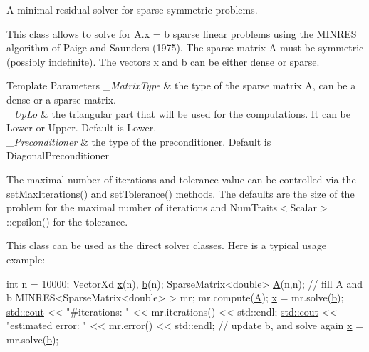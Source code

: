 A minimal residual solver for sparse symmetric problems. 

This class allows to solve for A.\+x = b sparse linear problems using the \hyperlink{class_eigen_1_1_m_i_n_r_e_s}{M\+I\+N\+R\+E\+S} algorithm of Paige and Saunders (1975). The sparse matrix A must be symmetric (possibly indefinite). The vectors x and b can be either dense or sparse.


\begin{DoxyTemplParams}{Template Parameters}
{\em \+\_\+\+Matrix\+Type} & the type of the sparse matrix A, can be a dense or a sparse matrix. \\
\hline
{\em \+\_\+\+Up\+Lo} & the triangular part that will be used for the computations. It can be Lower or Upper. Default is Lower. \\
\hline
{\em \+\_\+\+Preconditioner} & the type of the preconditioner. Default is Diagonal\+Preconditioner\\
\hline
\end{DoxyTemplParams}
The maximal number of iterations and tolerance value can be controlled via the set\+Max\+Iterations() and set\+Tolerance() methods. The defaults are the size of the problem for the maximal number of iterations and Num\+Traits$<$\+Scalar$>$\+::epsilon() for the tolerance.

This class can be used as the direct solver classes. Here is a typical usage example\+: 
\begin{DoxyCode}
\textcolor{keywordtype}{int} n = 10000;
VectorXd \hyperlink{plot_search_8m_a9336ebf25087d91c818ee6e9ec29f8c1}{x}(n), \hyperlink{run_multipole_8m_a21ad0bd836b90d08f4cf640b4c298e7c}{b}(n);
SparseMatrix<double> \hyperlink{_adams_bashforth_8m_a3b98e2dffc6cb06a89dcb0d5c60a0206}{A}(n,n);
\textcolor{comment}{// fill A and b}
MINRES<SparseMatrix<double> > mr;
mr.compute(\hyperlink{_adams_bashforth_8m_a3b98e2dffc6cb06a89dcb0d5c60a0206}{A});
\hyperlink{plot_search_8m_a9336ebf25087d91c818ee6e9ec29f8c1}{x} = mr.solve(\hyperlink{run_multipole_8m_a21ad0bd836b90d08f4cf640b4c298e7c}{b});
\hyperlink{namespacemodel_a0ce25fef078a7d9d9cb7cfbabcfbc289}{std::cout} << \textcolor{stringliteral}{"#iterations:     "} << mr.iterations() << std::endl;
\hyperlink{namespacemodel_a0ce25fef078a7d9d9cb7cfbabcfbc289}{std::cout} << \textcolor{stringliteral}{"estimated error: "} << mr.error()      << std::endl;
\textcolor{comment}{// update b, and solve again}
\hyperlink{plot_search_8m_a9336ebf25087d91c818ee6e9ec29f8c1}{x} = mr.solve(\hyperlink{run_multipole_8m_a21ad0bd836b90d08f4cf640b4c298e7c}{b});
\end{DoxyCode}



